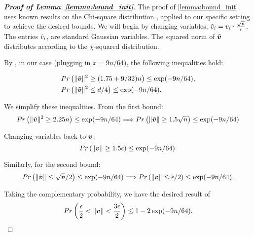 \begin{proof}[\textbf{Proof of Lemma~\ref{lemma:bound_init}}]
The proof of \ref{lemma:bound_init} uses known results on the Chi-square distribution \cite{laurent2000adaptive}, applied to our specific setting to achieve the desired bounds.
We will begin by changing variables, $\tilde{{v}}_i = {v}_i\cdot \frac{\sqrt{n}}{\epsilon}$. The entries $\tilde{{v}}_i$, are standard Gaussian variables. The squared norm of $\tilde{{\bm{v}}}$ distributes according to the $\chi$-squared distribution.

By \cite[Lemma 1]{laurent2000adaptive}, in our case (plugging in $x= 9n/64$), the following inequalities hold:

\begin{align}
    &Pr\left(\|\tilde{{\bm{v}}}\|^2 \geq (1.75 +9/32) n\right) \leq \exp(-9n/64),\\
    &Pr\left(\|\tilde{{\bm{v}}}\|^2 \leq d/4\right) \leq \exp(-9n/64).
\end{align}

We simplify these inequalities. From the first bound:
\begin{equation}
    Pr\left(\|\tilde{{\bm{v}}}\|^2 \geq 2.25 n\right) \leq \exp(-9n/64) \Longrightarrow Pr\left(\|\tilde{{\bm{v}}}\| \geq 1.5 \sqrt{n}\right) \leq \exp(-9n/64)
\end{equation}

Changing variables back to ${\bm{v}}$:
\begin{equation}
    Pr\left(\|{\bm{v}}\| \geq 1.5 \epsilon\right) \leq \exp(-9n/64).
\end{equation}

Similarly, for the second bound:
\begin{align}
    Pr\left(\|\tilde{{\bm{v}}}\| \leq \sqrt{n}/2\right) \leq \exp(-9n/64)
    \Longrightarrow Pr\left(\|{\bm{v}}\| \leq \epsilon/2\right) \leq \exp(-9n/64).
\end{align}

Taking the complementary probability, we have the desired result of
\begin{equation}
Pr\left(\frac{\epsilon}{2}< \|{\bm{v}}\| < \frac{3\epsilon}{2}\right) \leq 1- 2 \exp(-9n/64 ).
\end{equation}
\end{proof}


